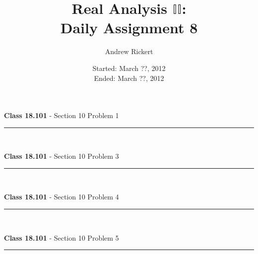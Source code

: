 \documentclass[11pt,reqno]{article}
\title{Real Analysis $\mathbb{II}$: \\ Daily Assignment 8}
\author{Andrew Rickert}
\date{Started: March ??, 2012 \\ \hspace{1pt} Ended: March ??,  2012}                                           %
\begin{document}
\maketitle

\begin{flushleft} 
\textbf{Class 18.101} - Section 10 Problem 1\\
\rule{500pt}{1pt}\\
\end{flushleft} 


\begin{flushleft} 
\textbf{Class 18.101} - Section 10 Problem 3\\
\rule{500pt}{1pt}\\
\end{flushleft} 


\begin{flushleft} 
\textbf{Class 18.101} - Section 10 Problem 4\\
\rule{500pt}{1pt}\\
\end{flushleft} 


\begin{flushleft} 
\textbf{Class 18.101} - Section 10 Problem 5\\
\rule{500pt}{1pt}\\
\end{flushleft} 
\end{document}
